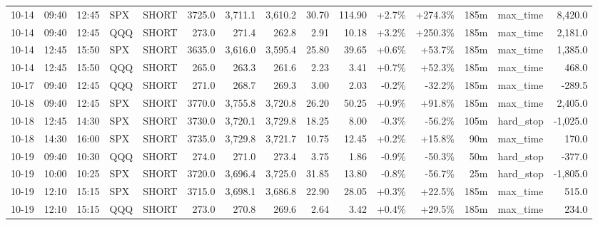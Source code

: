 \documentclass[11pt,a4paper,twoside]{article}
\begin{document}
\begin{landscape}
\begin{center}
\begin{longtable}{>{\color{txtmain}}l l l l l r r r r r r r r >{\color{txtmain}}l r}
10-14 & 09:40 & 12:45 & SPX & SHORT & 3725.0 & 3,711.1 & 3,610.2 & 30.70 & 114.90 & \textcolor{wingreen}{+2.7\%} & \textcolor{wingreen}{+274.3\%} & 185m & max\_time & \textcolor{wingreen}{8,420.0} \\
10-14 & 09:40 & 12:45 & QQQ & SHORT & 273.0 & 271.4 & 262.8 & 2.91 & 10.18 & \textcolor{wingreen}{+3.2\%} & \textcolor{wingreen}{+250.3\%} & 185m & max\_time & \textcolor{wingreen}{2,181.0} \\
10-14 & 12:45 & 15:50 & SPX & SHORT & 3635.0 & 3,616.0 & 3,595.4 & 25.80 & 39.65 & \textcolor{wingreen}{+0.6\%} & \textcolor{wingreen}{+53.7\%} & 185m & max\_time & \textcolor{wingreen}{1,385.0} \\
10-14 & 12:45 & 15:50 & QQQ & SHORT & 265.0 & 263.3 & 261.6 & 2.23 & 3.41 & \textcolor{wingreen}{+0.7\%} & \textcolor{wingreen}{+52.3\%} & 185m & max\_time & \textcolor{wingreen}{468.0} \\
10-17 & 09:40 & 12:45 & QQQ & SHORT & 271.0 & 268.7 & 269.3 & 3.00 & 2.03 & \textcolor{lossred}{-0.2\%} & \textcolor{lossred}{-32.2\%} & 185m & max\_time & \textcolor{lossred}{-289.5} \\
10-18 & 09:40 & 12:45 & SPX & SHORT & 3770.0 & 3,755.8 & 3,720.8 & 26.20 & 50.25 & \textcolor{wingreen}{+0.9\%} & \textcolor{wingreen}{+91.8\%} & 185m & max\_time & \textcolor{wingreen}{2,405.0} \\
10-18 & 12:45 & 14:30 & SPX & SHORT & 3730.0 & 3,720.1 & 3,729.8 & 18.25 & 8.00 & \textcolor{lossred}{-0.3\%} & \textcolor{lossred}{-56.2\%} & 105m & hard\_stop & \textcolor{lossred}{-1,025.0} \\
10-18 & 14:30 & 16:00 & SPX & SHORT & 3735.0 & 3,729.8 & 3,721.7 & 10.75 & 12.45 & \textcolor{wingreen}{+0.2\%} & \textcolor{wingreen}{+15.8\%} & 90m & max\_time & \textcolor{wingreen}{170.0} \\
10-19 & 09:40 & 10:30 & QQQ & SHORT & 274.0 & 271.0 & 273.4 & 3.75 & 1.86 & \textcolor{lossred}{-0.9\%} & \textcolor{lossred}{-50.3\%} & 50m & hard\_stop & \textcolor{lossred}{-377.0} \\
10-19 & 10:00 & 10:25 & SPX & SHORT & 3720.0 & 3,696.4 & 3,725.0 & 31.85 & 13.80 & \textcolor{lossred}{-0.8\%} & \textcolor{lossred}{-56.7\%} & 25m & hard\_stop & \textcolor{lossred}{-1,805.0} \\
10-19 & 12:10 & 15:15 & SPX & SHORT & 3715.0 & 3,698.1 & 3,686.8 & 22.90 & 28.05 & \textcolor{wingreen}{+0.3\%} & \textcolor{wingreen}{+22.5\%} & 185m & max\_time & \textcolor{wingreen}{515.0} \\
10-19 & 12:10 & 15:15 & QQQ & SHORT & 273.0 & 270.8 & 269.6 & 2.64 & 3.42 & \textcolor{wingreen}{+0.4\%} & \textcolor{wingreen}{+29.5\%} & 185m & max\_time & \textcolor{wingreen}{234.0} \\

\end{longtable}
\end{center}
\end{landscape}
\end{document}

